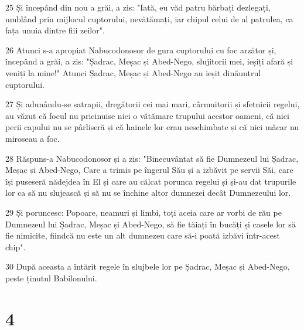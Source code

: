 \par 25 Și începând din nou a grăi, a zis: "Iată, eu văd patru bărbați dezlegați, umblând prin mijlocul cuptorului, nevătămați, iar chipul celui de al patrulea, ca fața unuia dintre fiii zeilor".
\par 26 Atunci s-a apropiat Nabucodonosor de gura cuptorului cu foc arzător și, începând a grăi, a zis: "Șadrac, Meșac și Abed-Nego, slujitorii mei, ieșiți afară și veniți la mine!" Atunci Șadrac, Meșac și Abed-Nego au ieșit dinăuntrul cuptorului.
\par 27 Și adunându-se satrapii, dregătorii cei mai mari, cârmuitorii și sfetnicii regelui, au văzut că focul nu pricinuise nici o vătămare trupului acestor oameni, că nici perii capului nu se pârliseră și că hainele lor erau neschimbate și că nici măcar nu miroseau a foc.
\par 28 Răspuns-a Nabucodonosor și a zis: "Binecuvântat să fie Dumnezeul lui Șadrac, Meșac și Abed-Nego, Care a trimis pe îngerul Său și a izbăvit pe servii Săi, care își puseseră nădejdea în El și care au călcat porunca regelui și și-au dat trupurile lor ca să nu slujească și să nu se închine altor dumnezei decât Dumnezeului lor.
\par 29 Și poruncesc: Popoare, neamuri și limbi, toți aceia care ar vorbi de rău pe Dumnezeul lui Șadrac, Meșac și Abed-Nego, să fie tăiați în bucăți și casele lor să fie nimicite, fiindcă nu este un alt dumnezeu care să-i poată izbăvi într-acest chip".
\par 30 După aceasta a întărit regele în slujbele lor pe Șadrac, Meșac și Abed-Nego, peste ținutul Babilonului.

\chapter{4}

